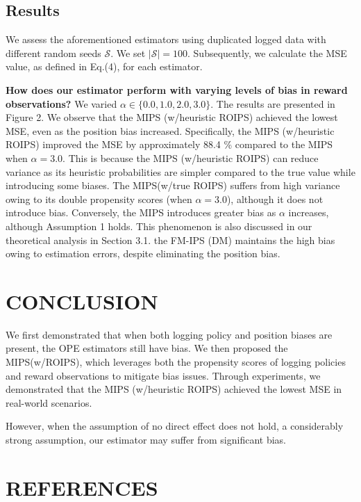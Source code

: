 \documentclass[a4paper,10pt]{article} %
\begin{document}
\begin{multicols}{2}
\subsection{Results}
We assess the aforementioned estimators using duplicated logged data with different random seeds \( \mathcal{S} \). We set \( |\mathcal{S}| = 100 \). Subsequently, we calculate the MSE value, as defined in Eq.(4), for each estimator.

\textbf{How does our estimator perform with varying levels of bias in reward observations?} We varied \( \alpha \in \{ 0.0, 1.0, 2.0, 3.0 \} \). The results are presented in Figure 2. We observe that the MIPS (w/heuristic ROIPS) achieved the lowest MSE, even as the position bias increased. Specifically, the MIPS (w/heuristic ROIPS) improved the MSE by approximately 88.4 \% compared to the MIPS when \( \alpha = 3.0 \).
This is because the MIPS (w/heuristic ROIPS) can reduce variance as its heuristic probabilities are simpler compared to the true value while introducing some biases. The MIPS(w/true ROIPS) suffers from high variance owing to its double propensity scores (when \( \alpha = 3.0 \)), although it does not introduce bias. Conversely, the MIPS introduces greater bias as \( \alpha \) increases, although Assumption 1 holds. This phenomenon is also discussed in our theoretical analysis in Section 3.1. the FM-IPS (DM) maintains the high bias owing to estimation errors, despite eliminating the position bias.

\section{CONCLUSION}
We first demonstrated that when both logging policy and position biases are present, the OPE estimators still have bias. We then proposed the MIPS(w/ROIPS), which leverages both the propensity scores of logging policies and reward observations to mitigate bias issues. Through experiments, we demonstrated that the MIPS (w/heuristic ROIPS) achieved the lowest MSE in real-world scenarios. 

However, when the assumption of no direct effect does not hold, a considerably strong assumption, our estimator may suffer from significant bias.

\section*{REFERENCES}
\printbibliography[heading=none]

\end{multicols}
\end{document}
